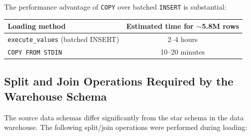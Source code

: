 \documentclass[12pt,a4paper]{article}
\begin{document}
The performance advantage of \texttt{COPY} over batched \texttt{INSERT} is
substantial:

\begin{center}
\begin{tabular}{lc}
\toprule
\textbf{Loading method} & \textbf{Estimated time for $\sim$5.8M rows} \\
\midrule
\texttt{execute\_values} (batched INSERT) & 2–4 hours \\
\texttt{COPY FROM STDIN}                  & 10–20 minutes \\
\bottomrule
\end{tabular}
\end{center}

\subsection{Split and Join Operations Required by the Warehouse Schema}

The source data schemas differ significantly from the star schema in the data
warehouse. The following split/join operations were performed during loading:
\end{document}
